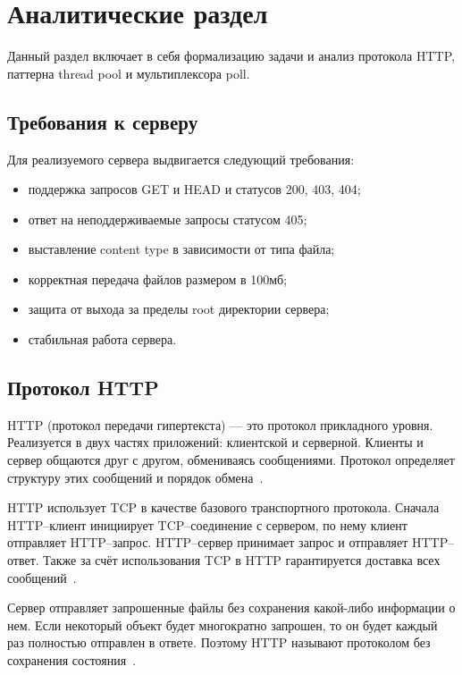 \chapter{Аналитические раздел}

Данный раздел включает в себя формализацию задачи и анализ протокола HTTP, паттерна thread pool и мультиплексора poll.

\section{Требования к серверу}

Для реализуемого сервера выдвигается следующий требования:
\begin{itemize}[label=---]
	\item поддержка запросов GET и HEAD и статусов 200, 403, 404;
	\item ответ на неподдерживаемые запросы статусом 405;
	\item выставление content type в зависимости от типа файла;
	\item корректная передача файлов размером в 100мб;
	\item защита от выхода за пределы root директории сервера;
	\item стабильная работа сервера.
\end{itemize}

\section{Протокол HTTP}

HTTP (протокол передачи гипертекста) --- это протокол прикладного уровня. Реализуется в двух частях приложений: клиентской и серверной. Клиенты и сервер общаются друг с другом, обмениваясь сообщениями. Протокол определяет структуру этих сообщений и порядок обмена~\cite{seti}.

HTTP использует TCP в качестве базового транспортного протокола. Сначала HTTP--клиент инициирует TCP--соединение с сервером, по нему клиент отправляет HTTP--запрос. HTTP--сервер принимает запрос и отправляет HTTP--ответ. Также за счёт использования TCP в HTTP гарантируется доставка всех сообщений~\cite{seti}. 

Сервер отправляет запрошенные файлы без сохранения какой-либо информации о нем. Если некоторый объект будет многократно запрошен, то он будет каждый раз полностью отправлен в ответе. Поэтому HTTP называют протоколом
без сохранения состояния~\cite{seti}.


